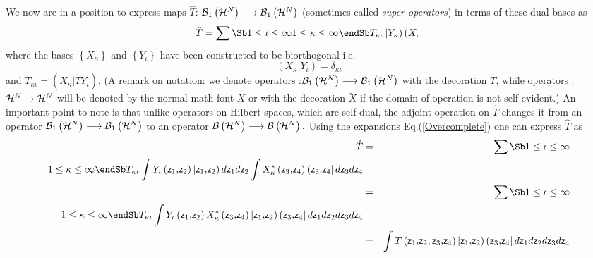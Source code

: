 We now are in a position to express maps $\hat{T}$: ${\cal B}_{1}\left( 
{\cal H}^{N}\right) \longrightarrow {\cal B}_{1}\left( {\cal H}^{N}\right) $
(sometimes called {\it super operators}) in terms of these dual bases as%
\begin{equation}
\hat{T}=\sum\Sb 1\leq \iota \leq \infty  \\ 1\leq \kappa \leq \infty  \endSb %
T_{\kappa \iota }\left| Y_{\kappa }\right) \left( X_{\iota }\right|
\end{equation}%
where the bases $\left\{ X_{\kappa }\right\} $ and $\left\{ Y_{\iota
}\right\} $ have been constructed to be biorthogonal i.e.%
\begin{equation}
\left( X_{\kappa }|Y_{\iota }\right) =\delta _{\kappa \iota }
\end{equation}%
and $T_{\kappa \iota }=\left( X_{\kappa }|\hat{T}Y_{\iota }\right) $. (A
remark on notation: we denote operators :${\cal B}_{1}\left( {\cal H}%
^{N}\right) \longrightarrow {\cal B}_{1}\left( {\cal H}^{N}\right) $ with
the decoration $\hat{T}$, while operators :${\cal H}^{N}\rightarrow {\cal H}%
^{N}$ will be denoted by the normal math font $X$ or with the decoration $%
\breve{X}$ if the domain of operation is not self evident.) An important
point to note is that unlike operators on Hilbert spaces, which are self
dual, the adjoint operation on $\hat{T}$ changes it from an operator ${\cal B%
}_{1}\left( {\cal H}^{N}\right) \longrightarrow {\cal B}_{1}\left( {\cal H}%
^{N}\right) $ to an operator ${\cal B}\left( {\cal H}^{N}\right)
\longrightarrow {\cal B}\left( {\cal H}^{N}\right) .$ Using the expansions
Eq.(\ref{Overcomplete}) one can express $\hat{T}$ as%
\begin{eqnarray}
\hat{T} &=&\sum\Sb 1\leq \iota \leq \infty  \\ 1\leq \kappa \leq \infty 
\endSb T_{\kappa \iota }\int Y_{\iota }\left( {\sf z}_{1}{\bf ,}{\sf z}%
_{2}\right) \left| {\sf z}_{1}{\bf ,}{\sf z}_{2}\right) d{\sf z}_{1}d{\sf z}%
_{2}\int X_{\kappa }^{\ast }\left( {\sf z}_{3}{\bf ,}{\sf z}_{4}\right)
\left( {\sf z}_{3}{\bf ,}{\sf z}_{4}\right| d{\sf z}_{3}d{\sf z}_{4} 
\nonumber \\
&=&\sum\Sb 1\leq \iota \leq \infty  \\ 1\leq \kappa \leq \infty  \endSb %
T_{\kappa \iota }\int Y_{\iota }\left( {\sf z}_{1}{\bf ,}{\sf z}_{2}\right)
X_{\kappa }^{\ast }\left( {\sf z}_{3}{\bf ,}{\sf z}_{4}\right) \left| {\sf z}%
_{1}{\bf ,}{\sf z}_{2}\right) \left( {\sf z}_{3}{\bf ,}{\sf z}_{4}\right| d%
{\sf z}_{1}d{\sf z}_{2}d{\sf z}_{3}d{\sf z}_{4}  \nonumber \\
&=&\int T\left( {\sf z}_{1}{\bf ,}{\sf z}_{2},{\sf z}_{3}{\bf ,}{\sf z}%
_{4}\right) \left| {\sf z}_{1}{\bf ,}{\sf z}_{2}\right) \left( {\sf z}_{3}%
{\bf ,}{\sf z}_{4}\right| d{\sf z}_{1}d{\sf z}_{2}d{\sf z}_{3}d{\sf z}_{4}
\label{SuperOp}
\end{eqnarray}%

